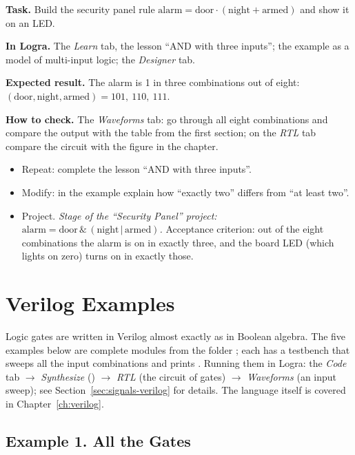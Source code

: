 \begin{diybox}
\textbf{Task.} Build the security panel rule
$\text{alarm}=\text{door}\cdot(\text{night}+\text{armed})$ and show it on an
LED.\par
\textbf{In Logra.} The \emph{Learn} tab, the lesson ``AND with three inputs''; the example
 as a model of multi-input logic; the
\emph{Designer} tab.\par
\textbf{Expected result.} The alarm is 1 in three combinations out of eight:
$(\text{door},\text{night},\text{armed})=101,\ 110,\ 111$.\par
\textbf{How to check.} The \emph{Waveforms} tab: go through all eight
combinations and compare the output with the table from the first section; on the
\emph{RTL} tab compare the circuit with the figure in the chapter.
\begin{itemize}[leftmargin=3.4em,labelwidth=3em,labelsep=0.4em,align=left]
  \item[\stars{1}] Repeat: complete the lesson ``AND with three inputs''.
  \item[\stars{2}] Modify: in the  example explain how ``exactly two''
    differs from ``at least two''.
  \item[\stars{3}] Project. \emph{Stage of the ``Security Panel'' project:
    $\text{alarm}=\text{door}\,\&\,(\text{night}\,|\,\text{armed})$.} Acceptance
    criterion: out of the eight combinations the alarm is on in exactly three, and the board
    LED (which lights on zero) turns on in exactly those.
\end{itemize}
\end{diybox}

\section{Verilog Examples}
\label{sec:gates-verilog}

Logic gates are written in Verilog almost exactly as in Boolean algebra. The
five examples below are complete modules from the folder
; each has a testbench  that sweeps all the
input combinations and prints . Running them in Logra: the \emph{Code}
tab $\to$ \emph{Synthesize} () $\to$ \emph{RTL} (the circuit
of gates) $\to$ \emph{Waveforms} (an input sweep); see
Section~\ref{sec:signals-verilog} for details. The language itself is covered in
Chapter~\ref{ch:verilog}.

\subsection{Example 1. All the Gates}

